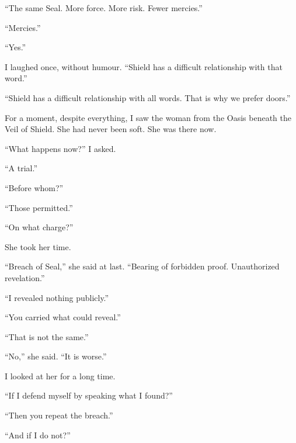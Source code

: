 ``The same Seal. More force. More risk. Fewer mercies.''\par

``Mercies.''\par

``Yes.''\par

I laughed once, without humour. ``Shield has a difficult relationship with that word.''\par

``Shield has a difficult relationship with all words. That is why we prefer doors.''\par

For a moment, despite everything, I saw the woman from the Oasis beneath the Veil of Shield. She had never been soft. She was there now.\par

``What happens now?'' I asked.\par

``A trial.''\par

``Before whom?''\par

``Those permitted.''\par

``On what charge?''\par

She took her time.\par

``Breach of Seal,'' she said at last. ``Bearing of forbidden proof. Unauthorized revelation.''\par

``I revealed nothing publicly.''\par

``You carried what could reveal.''\par

``That is not the same.''\par

``No,'' she said. ``It is worse.''\par

I looked at her for a long time.\par

``If I defend myself by speaking what I found?''\par

``Then you repeat the breach.''\par

``And if I do not?''\par

